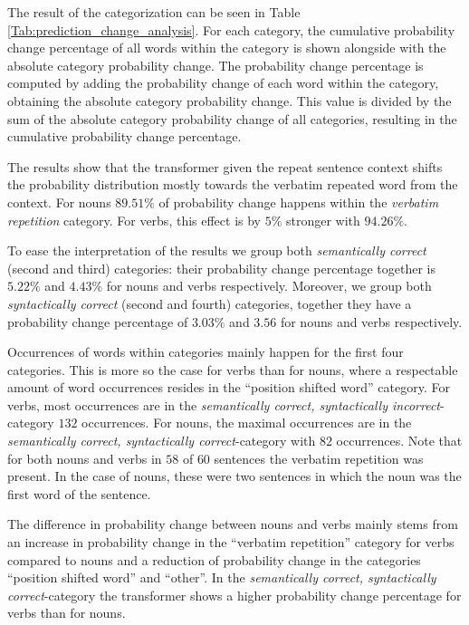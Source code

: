The result of the categorization can be seen in Table \ref{Tab:prediction_change_analysis}.
For each category, the cumulative probability change percentage of all words within the category is shown alongside with the absolute category probability change.
The probability change percentage is computed by adding the probability change of each word within the category, obtaining the absolute category probability change.
This value is divided by the sum of the absolute category probability change of all categories, resulting in the cumulative probability change percentage.

The results show that the transformer given the repeat sentence context shifts the probability distribution mostly towards the verbatim repeated word from the context.
For nouns $89.51\%$ of probability change happens within the \textit{verbatim repetition} category.
For verbs, this effect is by $5\%$ stronger with $94.26\%$.

To ease the interpretation of the results we group both \textit{semantically correct} (second and third) categories: their probability change percentage together is $5.22\%$ and $4.43\%$ for nouns and verbs respectively.
Moreover, we group both \textit{syntactically correct} (second and fourth) categories, together they have a probability change percentage of $3.03\%$ and $3.56$ for nouns and verbs respectively.

Occurrences of words within categories mainly happen for the first four categories.
This is more so the case for verbs than for nouns, where a respectable amount of word occurrences resides in the ``position shifted word'' category.
For verbs, most occurrences are in the \textit{semantically correct, syntactically incorrect}-category $132$ occurrences.
For nouns, the maximal occurrences are in the \textit{semantically correct, syntactically correct}-category with $82$ occurrences.
Note that for both nouns and verbs in $58$ of $60$ sentences the verbatim repetition was present.
In the case of nouns, these were two sentences in which the noun was the first word of the sentence.

The difference in probability change between nouns and verbs mainly stems from an increase in probability change in the ``verbatim repetition'' category for verbs compared to nouns and a reduction of probability change in the categories ``position shifted word'' and ``other''.
In the \textit{semantically correct, syntactically correct}-category the transformer shows a higher probability change percentage for verbs than for nouns.

